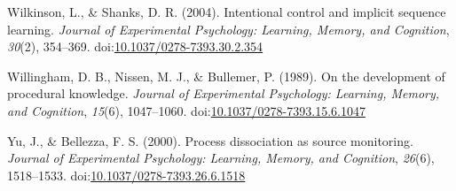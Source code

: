 \documentclass[man]{apa6}
\theoremstyle{definition}
\theoremstyle{definition}
\theoremstyle{definition}
\theoremstyle{remark}
\begin{document}
\hypertarget{ref-wilkinson_intentional_2004}{}
Wilkinson, L., \& Shanks, D. R. (2004). Intentional control and implicit
sequence learning. \emph{Journal of Experimental Psychology: Learning,
Memory, and Cognition}, \emph{30}(2), 354--369.
doi:\href{https://doi.org/10.1037/0278-7393.30.2.354}{10.1037/0278-7393.30.2.354}

\hypertarget{ref-willingham_development_1989}{}
Willingham, D. B., Nissen, M. J., \& Bullemer, P. (1989). On the
development of procedural knowledge. \emph{Journal of Experimental
Psychology: Learning, Memory, and Cognition}, \emph{15}(6), 1047--1060.
doi:\href{https://doi.org/10.1037/0278-7393.15.6.1047}{10.1037/0278-7393.15.6.1047}

\hypertarget{ref-yu_process_2000}{}
Yu, J., \& Bellezza, F. S. (2000). Process dissociation as source
monitoring. \emph{Journal of Experimental Psychology: Learning, Memory,
and Cognition}, \emph{26}(6), 1518--1533.
doi:\href{https://doi.org/10.1037/0278-7393.26.6.1518}{10.1037/0278-7393.26.6.1518}
\end{document}
